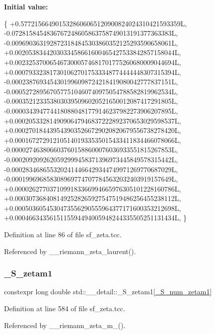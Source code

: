{\bfseries Initial value\+:}
\begin{DoxyCode}
\{
    +0.5772156649015328606065120900824024310421593359L, 
    -0.0728158454836767248605863758749013191377363383L, 
    -0.0096903631928723184845303860352125293590658061L, 
    +0.0020538344203033458661600465427533842857158044L, 
    +0.0023253700654673000574681701775260680009044694L, 
    +0.0007933238173010627017533348774444448307315394L, 
    -0.0002387693454301996098724218419080042777837151L, 
    -0.0005272895670577510460740975054788582819962534L, 
    -0.0003521233538030395096020521650012087417291805L, 
    -0.0000343947744180880481779146237982273906207895L, 
    +0.0002053328149090647946837222892370653029598537L, 
    +0.0002701844395439035266729020820679556738278420L,
    +0.0001672729121051401933535015433411834466078066L,
    -0.0000274638066037601588600076036933551815267853L,
    -0.0002092092620592999458371396973445849578315442L,
    -0.0002834686553202414466429344749971269770687029L,
    -0.0001996968583089697747077845632032403919157649L,
    +0.0000262770371099183366994665976305101228160786L,
    +0.0003073684081492528265927547519486256455238112L,
    +0.0005036054530473556290555964377171600353212698L,
    +0.0004663435615115594494005948244335505251131434L,
  \}
\end{DoxyCode}


Definition at line 86 of file sf\+\_\+zeta.\+tcc.



Referenced by \+\_\+\+\_\+riemann\+\_\+zeta\+\_\+laurent().

\mbox{\label{namespacestd_1_1____detail_a22ed80d9e5c3bc79e61a3cdb8e79a462}} 
\subsubsection{\texorpdfstring{\+\_\+\+S\+\_\+zetam1}{\_S\_zetam1}}
{\footnotesize\ttfamily constexpr long double std\+::\+\_\+\+\_\+detail\+::\+\_\+\+S\+\_\+zetam1\mbox{[}\hyperlink{namespacestd_1_1____detail_a807e36c2aec3a9f27fdb21726cd464e2}{\+\_\+\+S\+\_\+num\+\_\+zetam1}\mbox{]}}



Definition at line 584 of file sf\+\_\+zeta.\+tcc.



Referenced by \+\_\+\+\_\+riemann\+\_\+zeta\+\_\+m\+\_().

